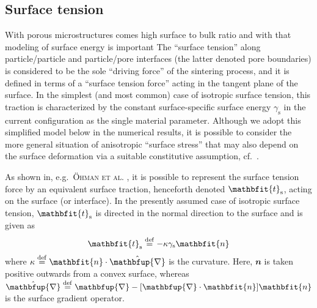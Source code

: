 \documentclass[12pt,a4paper,fleqn]{article}
\renewcommand{\ta}[1]{\mathbfit{#1}}
\renewcommand{\diff}{\mathbfup{\nabla}}
\newcommand{\figref}[1]{Figure~\ref{#1}}
\newcommand{\surf}{\mathrm{s}}
\begin{document}
%     


\subsection{Surface tension}

With porous microstructures comes high surface to bulk ratio and with that modeling of surface energy is important
The ``surface tension'' along particle/particle and particle/pore interfaces (the latter denoted pore boundaries) is considered to be the sole ``driving force'' of the sintering process, and it is defined in terms of a ``surface tension force'' acting in the tangent plane of the surface.
In the simplest (and most common) case of isotropic surface tension, this traction is characterized by the constant surface-specific surface energy $\gamma_\surf$ in the current configuration as the single material parameter.
Although we adopt this simplified model below in the numerical results, it is possible to consider the more general situation of anisotropic ``surface stress'' that may also depend on the surface deformation via a suitable constitutive assumption, cf.\ \cite{Steinmann2008:boundaryenergies}.

As shown in, e.g.\ \textsc{\"Ohman et al.} \cite{Ohman2012a}, it is possible to represent the surface tension force by an equivalent surface traction, henceforth denoted $\ta{t}_\fluct$, acting on the surface (or interface).
In the presently assumed case of isotropic surface tension, $\ta{t}_\fluct$ is directed in the normal direction to the surface and is given as
\begin{equation}
    \ta{t}_\surf\defeq -\kappa\gamma_\surf\ta{n}
\label{eq:surface_traction_strong}
\end{equation}
where $\kappa\defeq\ta{n}\cdot\hat{\diff}$ is the curvature.
Here, $\ta{n}$ is taken positive outwards from a convex surface, whereas $\hat\diff \defeq \diff - [\diff\cdot\ta{n}]\ta{n}$ is the surface gradient operator.
\end{document}
